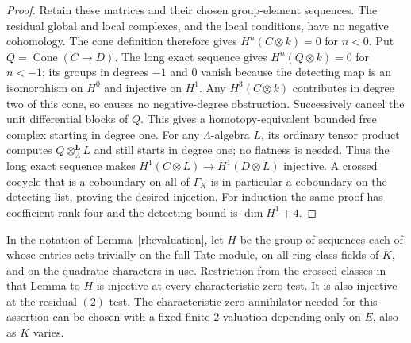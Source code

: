 \begin{proof}
Retain these matrices and their chosen group-element sequences.
The residual global and local complexes, and the local conditions,
have no negative cohomology.  The cone definition therefore gives
$H^n(C\otimes k)=0$ for $n<0$.  Put $Q=\operatorname{Cone}(C\to D)$.
The long exact sequence gives $H^n(Q\otimes k)=0$ for $n<-1$;
its groups in degrees $-1$ and $0$ vanish because the detecting map is
an isomorphism on $H^0$ and injective on $H^1$.  Any $H^3(C\otimes k)$
contributes in degree two of this cone, so causes no negative-degree
obstruction.  Successively cancel the unit differential blocks of
$Q$.  This gives a homotopy-equivalent bounded free complex starting
in degree one.  For any $\Lambda$-algebra $L$, its ordinary tensor
product computes $Q\otimes^{\mathbf L}_\Lambda L$ and still starts
in degree one; no flatness is needed.  Thus the long exact sequence
makes $H^1(C\otimes L)\to H^1(D\otimes L)$ injective.  A crossed cocycle that is a coboundary
on all of $\Gamma_K$ is in particular a coboundary on the detecting
list, proving the desired injection.  For induction the same proof
has coefficient rank four and the detecting bound is $\dim H^1+4$.
\end{proof}

\begin{lemma}\label{rl:kernel}
In the notation of Lemma~\ref{rl:evaluation}, let $H$ be the group of
sequences each of whose entries acts trivially on the full Tate module,
on all ring-class fields of $K$, and on the quadratic characters in
use.  Restriction from the crossed classes in that Lemma to $H$ is
injective at every characteristic-zero test.  It is also injective
at the residual $(2)$ test.  The characteristic-zero annihilator
needed for this assertion can be chosen with a fixed finite
$2$-valuation depending only on $E$, also as $K$ varies.
\end{lemma}

